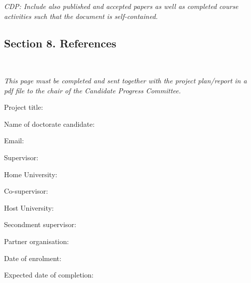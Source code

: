\documentclass[12pt]{article}
\newcommand{\dottedline}{%
   {\rule{0pt}{5mm}\dotfill\newline}}
\begin{document}
\begin{shaded}
\noindent
\emph{
CDP: Include also published and accepted papers as well as completed course activities such that the document is self-contained.}
\end{shaded}



\subsection*{Section 8. References}
%
\printbibliography{}



\pagebreak

\noindent{}\\[5mm]

\emph{This page must be completed and sent together with the project
plan/report in a pdf file to the chair of the Candidate Progress Committee.}

\vspace*{3mm}

\noindent
Project title: \dottedline
Name of doctorate candidate: \dottedline
Email: \dottedline
Supervisor: \dottedline
Home University: \dottedline
Co-supervisor: \dottedline
Host University: \dottedline
Secondment supervisor: \dottedline
Partner organisation: \dottedline
Date of enrolment: \dottedline
Expected date of completion: \dottedline
\end{document}
